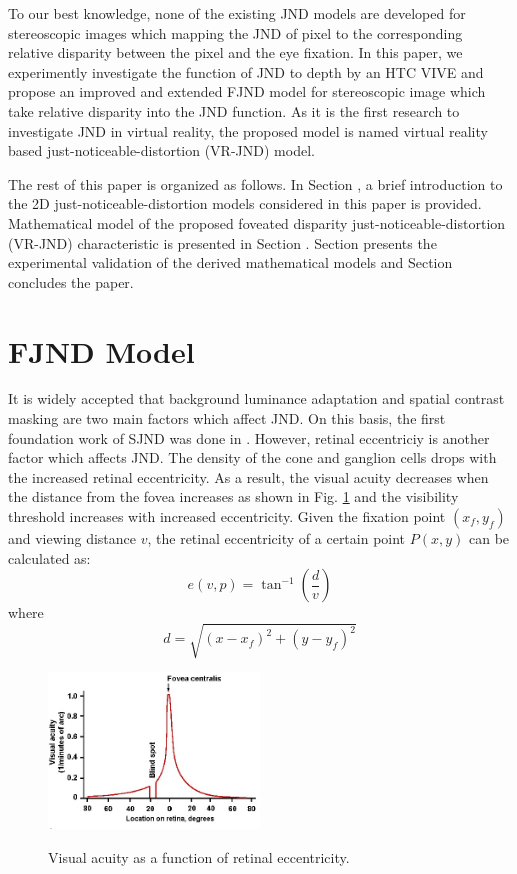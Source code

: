 \documentclass[journal]{IEEEtran}
\begin{document}
To our best knowledge, none of the existing JND models are developed for stereoscopic images which mapping the JND of pixel to the corresponding relative disparity between the pixel and the eye fixation. In this paper, we experimently investigate the function of JND to depth by an HTC VIVE and propose an improved and extended FJND model for stereoscopic image which take relative disparity into the JND function. As it is the first research to investigate JND in virtual reality, the proposed model is named virtual reality based just-noticeable-distortion (VR-JND) model.

The rest of this paper is organized as follows. In Section \uppercase\expandafter{}, a brief introduction to the 2D just-noticeable-distortion models considered in this paper is provided. Mathematical model of the proposed foveated disparity just-noticeable-distortion (VR-JND) characteristic is presented in Section \uppercase\expandafter{}. Section \uppercase\expandafter{} presents the experimental validation of the derived mathematical models and Section \uppercase\expandafter{} concludes the paper.

\section{FJND Model}
It is widely accepted that background luminance adaptation and spatial contrast masking are two main factors which affect JND. On this basis, the first foundation work of SJND was done in \cite{RN634}. However, retinal eccentriciy is another factor which affects JND. The density of the cone and ganglion cells drops with the increased retinal eccentricity. As a result, the visual acuity decreases when the distance from the fovea increases as shown in Fig. \ref{fig:Visualacuity} and the visibility threshold increases with increased eccentricity. Given the fixation point $\left( x_f,y_f\right)$ and viewing distance $v$, the retinal eccentricity of a certain point $P\left(x,y\right)$ can be calculated as:
\begin{equation}
e\left (  v,p\right )=\tan^{-1}\left ( \frac{d}{v} \right )
\end{equation}
where \begin{equation}
d= \sqrt{\left ( x-x_f \right )^2+\left ( y-y_f \right )^2 }
\end{equation}
\begin{figure}[!t]
	\centering
	\includegraphics[width=0.5\textwidth]{blndspot}\\
	\caption{Visual acuity as a function of retinal eccentricity.}
	\label{fig:Visualacuity}
\end{figure}
\end{document}
